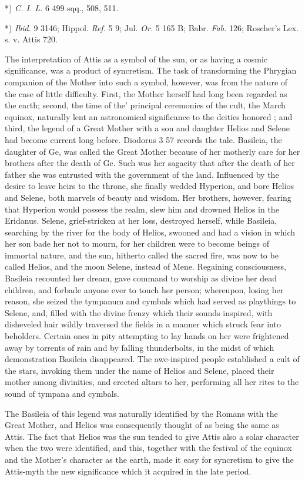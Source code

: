 \documentclass[a4paper, 11pt, oneside, polutonikogreek, english]{article}
\begin{document}
*) \emph{C. I. L.} 6 499 sqq., 508, 511.

*) \emph{Ibid.} 9 3146; Hippol. \emph{Ref.} 5 9; Jul. \emph{Or.} 5 165 B; Babr. \emph{Fab.} 126; Roscher's Lex. s. v. Attis 720.

The interpretation of Attis as a symbol of the sun, or as having a cosmic significance, was a product of syncretism. The task of transforming the Phrygian companion of the Mother into such a symbol, however, was from the nature of the case of little difficulty. First, the Mother herself had long been regarded as the earth; second, the time of the' principal ceremonies of the cult, the March equinox, naturally lent an astronomical significance to the deities honored ; and third, the legend of a Great Mother with a son and daughter Helios and Selene had become current long before. Diodorus 3 57 records the tale. Basileia, the daughter of Ge, was called the Great Mother because of her motherly care for her brothers after the death of Ge. Such was her sagacity that after the death of her father she was entrusted with the government of the land. Influenced by the desire to leave heirs to the throne, she finally wedded Hyperion, and bore Helios and Selene, both marvels of beauty and wisdom. Her brothers, however, fearing that Hyperion would possess the realm, slew him and drowned Helios in the Eridanus. Selene, grief-stricken at her loss, destroyed herself, while Basileia, searching by the river for the body of Helios, swooned and had a vision in which her son bade her not to mourn, for her children were to become beings of immortal nature, and the sun, hitherto called the sacred fire, was now to be called Helios, and the moon Selene, instead of Mene. Regaining consciousness, Basileia recounted her dream, gave command to worship as divine her dead children, and forbade anyone ever to touch her person; whereupon, losing her reason, she seized the tympanum and cymbals which had served as playthings to Selene, and, filled with the divine frenzy which their sounds inspired, with disheveled hair wildly traversed the fields in a manner which struck fear into beholders. Certain ones in pity attempting to lay hands on her were frightened away by torrents of rain and by falling thunderbolts, in the midst of which demonstration Basileia disappeared. The awe-inspired people established a cult of the stars, invoking them under the name of Helios and Selene, placed their mother among divinities, and erected altars to her, performing all her rites to the sound of tympana and cymbals.

The Basileia of this legend was naturally identified by the Romans with the Great Mother, and Helios was consequently thought of as being the same as Attis. The fact that Helios was the sun tended to give Attis also a solar character when the two were identified, and this, together with the festival of the equinox and the Mother's character as the earth, made it easy for syncretism to give the Attis-myth the new significance which it acquired in the late period.
\end{document}
